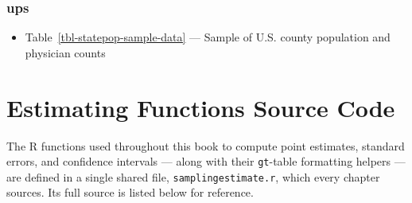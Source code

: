 \documentclass[
  letterpaper,
  DIV=11,
  numbers=noendperiod]{scrreprt}
\providecommand{\tightlist}{%
  \setlength{\itemsep}{0pt}\setlength{\parskip}{0pt}}
\renewcommand{\[}{\begin{equation}}
\renewcommand{\]}{\end{equation}}
\begin{document}
\subsection{ups}\label{ups-1}

\begin{itemize}
\tightlist
\item
  Table~\ref{tbl-statepop-sample-data} --- Sample of U.S. county
  population and physician counts
\end{itemize}

\chapter{Estimating Functions Source
Code}\label{estimating-functions-source-code}

The R functions used throughout this book to compute point estimates,
standard errors, and confidence intervals --- along with their
\texttt{gt}-table formatting helpers --- are defined in a single shared
file, \texttt{samplingestimate.r}, which every chapter sources. Its full
source is listed below for reference.
\end{document}
